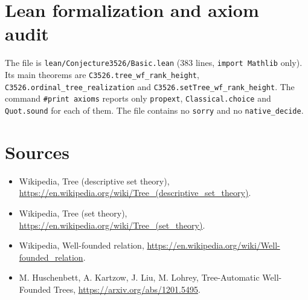 \documentclass[11pt]{article}
\theoremstyle{definition}
\begin{document}
\section*{Lean formalization and axiom audit}
The file is \texttt{lean/Conjecture3526/Basic.lean} (383 lines, \texttt{import Mathlib} only). Its main
theorems are \texttt{C3526.tree\_wf\_rank\_height}, \texttt{C3526.ordinal\_tree\_realization} and
\texttt{C3526.setTree\_wf\_rank\_height}. The command \texttt{\#print axioms} reports only
\texttt{propext}, \texttt{Classical.choice} and \texttt{Quot.sound} for each of them. The file contains
no \texttt{sorry} and no \texttt{native\_decide}.

\section*{Sources}
\begin{itemize}
\item Wikipedia, Tree (descriptive set theory), \url{https://en.wikipedia.org/wiki/Tree_(descriptive_set_theory)}.
\item Wikipedia, Tree (set theory), \url{https://en.wikipedia.org/wiki/Tree_(set_theory)}.
\item Wikipedia, Well-founded relation, \url{https://en.wikipedia.org/wiki/Well-founded_relation}.
\item M. Huschenbett, A. Kartzow, J. Liu, M. Lohrey, Tree-Automatic Well-Founded Trees, \url{https://arxiv.org/abs/1201.5495}.
\end{itemize}
\end{document}
